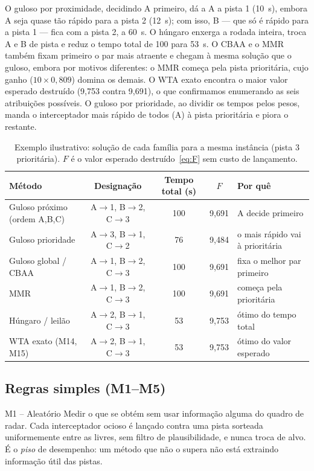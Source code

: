 O guloso por proximidade, decidindo A primeiro, dá a A a pista 1 (10~s), embora A seja quase tão rápido para a pista 2
(12~s); com isso, B --- que só é rápido para a pista 1 --- fica com a pista 2, a 60~s. O húngaro enxerga a rodada inteira,
troca A e B de pista e reduz o tempo total de 100 para 53~s. O CBAA e o MMR também fixam primeiro o par mais atraente e
chegam à mesma solução que o guloso, embora por motivos diferentes: o MMR começa pela pista prioritária, cujo ganho
($10\times0{,}809$) domina os demais. O WTA exato encontra o maior valor esperado destruído (9,753 contra 9,691), o que
confirmamos enumerando as seis atribuições possíveis. O guloso por prioridade, ao dividir os tempos pelos pesos, manda o
interceptador mais rápido de todos (A) à pista prioritária e piora o restante.

\begin{table}[t]
\centering
\caption{Exemplo ilustrativo: solução de cada família para a mesma instância (pista 3 prioritária). $F$ é o valor
esperado destruído~\eqref{eq:F} sem custo de lançamento.}
\label{tab:exemplo}
\small
\begin{tabular}{@{}lcccl@{}}
\toprule
Método & Designação & Tempo total (s) & $F$ & Por quê \\
\midrule
Guloso próximo (ordem A,B,C) & A$\to$1, B$\to$2, C$\to$3 & 100 & 9,691 & A decide primeiro \\
Guloso prioridade & A$\to$3, B$\to$1, C$\to$2 & 76 & 9,484 & o mais rápido vai à prioritária \\
Guloso global / CBAA & A$\to$1, B$\to$2, C$\to$3 & 100 & 9,691 & fixa o melhor par primeiro \\
MMR & A$\to$1, B$\to$2, C$\to$3 & 100 & 9,691 & começa pela prioritária \\
Húngaro / leilão & A$\to$2, B$\to$1, C$\to$3 & 53 & 9,753 & ótimo do tempo total \\
WTA exato (M14, M15) & A$\to$2, B$\to$1, C$\to$3 & 53 & 9,753 & ótimo do valor esperado \\
\bottomrule
\end{tabular}
\end{table}

\subsection{Regras simples (M1--M5)}

\begin{metodo}{M1 -- Aleatório}
\ideia Medir o que se obtém sem usar informação alguma do quadro de radar.
\func Cada interceptador ocioso é lançado contra uma pista sorteada uniformemente entre as livres, sem filtro de
plausibilidade, e nunca troca de alvo.
\espera É o \emph{piso} de desempenho: um método que não o supera não está extraindo informação útil das pistas.
\end{metodo}

